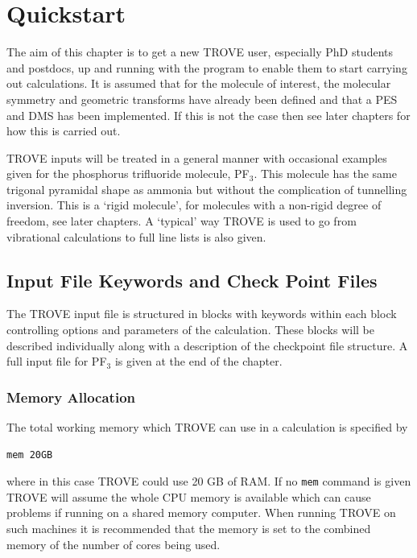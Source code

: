 

\chapter{Quickstart}
\label{chap:Quickstart}
The aim of this chapter is to get a new TROVE user, especially PhD students and postdocs, up 
and running with the program to enable them to start carrying out calculations. 
It is assumed that for the molecule of interest, the molecular symmetry and geometric transforms have already been defined 
and that a PES and DMS has been implemented. 
If this is not the case then see later chapters for how this is carried out. 

TROVE inputs will be treated in a general manner with occasional examples given for 
the phosphorus trifluoride molecule, PF$_3$. This molecule has the same trigonal pyramidal shape as ammonia but 
without the complication of tunnelling inversion. This is a `rigid molecule', for molecules with a non-rigid degree of 
freedom, see later chapters. A `typical' way TROVE is used to go from vibrational calculations 
to full line lists is also given. 


\section{Input File Keywords and Check Point Files}
The TROVE input file is structured in blocks with keywords within each block controlling options and parameters
of the calculation. 
These blocks will be described individually along with a description of the checkpoint file structure. 
A full input file for PF$_3$ is given at the end of the chapter.

\subsection{Memory Allocation}
The total working memory which TROVE can use in a calculation is specified by 
\begin{verbatim}
mem 20GB
\end{verbatim}
where in this case TROVE could use 20 GB of RAM. If no \verb|mem| command is given TROVE will 
assume the whole CPU memory is available which can cause problems if running on a shared memory computer. When running TROVE
on such machines it is recommended that the memory is set to the combined memory of the number of cores being used.  

